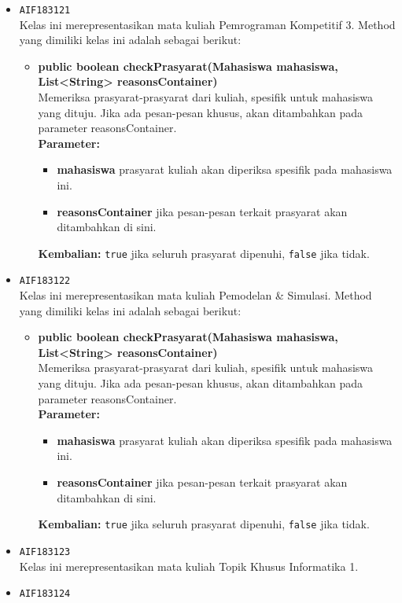 \begin{enumerate}
\begin{itemize}
\item \texttt{AIF183121} \\
Kelas ini merepresentasikan mata kuliah Pemrograman Kompetitif 3. Method yang dimiliki kelas ini adalah sebagai berikut: 
\begin{itemize}
\item \textbf{public boolean checkPrasyarat(Mahasiswa mahasiswa, List<String> reasonsContainer)}\\
Memeriksa prasyarat-prasyarat dari kuliah, spesifik untuk mahasiswa yang dituju. Jika ada pesan-pesan khusus, akan ditambahkan pada parameter reasonsContainer.\\
\textbf{Parameter:}
\begin{itemize}
\item \textbf{mahasiswa} prasyarat kuliah akan diperiksa spesifik pada mahasiswa ini.
\item \textbf{reasonsContainer} jika pesan-pesan terkait prasyarat akan ditambahkan di sini.
\end{itemize}
\textbf{Kembalian:} \texttt{true} jika seluruh prasyarat dipenuhi, \texttt{false} jika tidak.
\end{itemize}
\item \texttt{AIF183122} \\
Kelas ini merepresentasikan mata kuliah Pemodelan \& Simulasi. Method yang dimiliki kelas ini adalah sebagai berikut: 
\begin{itemize}
\item \textbf{public boolean checkPrasyarat(Mahasiswa mahasiswa, List<String> reasonsContainer)}\\
Memeriksa prasyarat-prasyarat dari kuliah, spesifik untuk mahasiswa yang dituju. Jika ada pesan-pesan khusus, akan ditambahkan pada parameter reasonsContainer.\\
\textbf{Parameter:}
\begin{itemize}
\item \textbf{mahasiswa} prasyarat kuliah akan diperiksa spesifik pada mahasiswa ini.
\item \textbf{reasonsContainer} jika pesan-pesan terkait prasyarat akan ditambahkan di sini.
\end{itemize}
\textbf{Kembalian:} \texttt{true} jika seluruh prasyarat dipenuhi, \texttt{false} jika tidak.
\end{itemize}
\item \texttt{AIF183123} \\
Kelas ini merepresentasikan mata kuliah Topik Khusus Informatika 1.
\item \texttt{AIF183124} \\

\end{itemize}
\end{enumerate}
